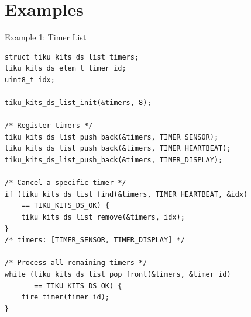 \documentclass[aspectratio=169, 10pt]{beamer}
\begin{document}
\section{Examples}

\begin{frame}[fragile]{Example 1: Timer List}
\begin{lstlisting}[style=cstyle,
  title={Managing active timers with a linked list}]
struct tiku_kits_ds_list timers;
tiku_kits_ds_elem_t timer_id;
uint8_t idx;

tiku_kits_ds_list_init(&timers, 8);

/* Register timers */
tiku_kits_ds_list_push_back(&timers, TIMER_SENSOR);
tiku_kits_ds_list_push_back(&timers, TIMER_HEARTBEAT);
tiku_kits_ds_list_push_back(&timers, TIMER_DISPLAY);

/* Cancel a specific timer */
if (tiku_kits_ds_list_find(&timers, TIMER_HEARTBEAT, &idx)
    == TIKU_KITS_DS_OK) {
    tiku_kits_ds_list_remove(&timers, idx);
}
/* timers: [TIMER_SENSOR, TIMER_DISPLAY] */

/* Process all remaining timers */
while (tiku_kits_ds_list_pop_front(&timers, &timer_id)
       == TIKU_KITS_DS_OK) {
    fire_timer(timer_id);
}
\end{lstlisting}
\end{frame}
\end{document}
